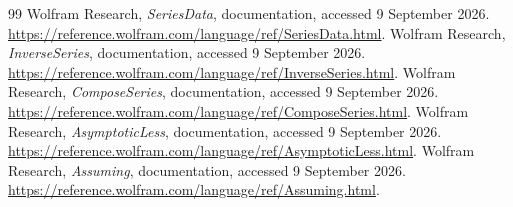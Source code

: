 \documentclass[11pt,a4paper]{article}
\begin{document}
\begin{thebibliography}{99}
 Wolfram Research, \emph{SeriesData}, documentation, accessed 9 September 2026. \url{https://reference.wolfram.com/language/ref/SeriesData.html}.
 Wolfram Research, \emph{InverseSeries}, documentation, accessed 9 September 2026. \url{https://reference.wolfram.com/language/ref/InverseSeries.html}.
 Wolfram Research, \emph{ComposeSeries}, documentation, accessed 9 September 2026. \url{https://reference.wolfram.com/language/ref/ComposeSeries.html}.
 Wolfram Research, \emph{AsymptoticLess}, documentation, accessed 9 September 2026. \url{https://reference.wolfram.com/language/ref/AsymptoticLess.html}.
 Wolfram Research, \emph{Assuming}, documentation, accessed 9 September 2026. \url{https://reference.wolfram.com/language/ref/Assuming.html}.
\end{thebibliography}
\end{document}
